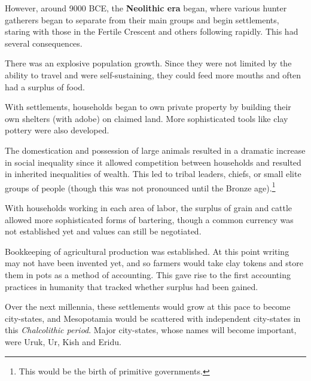 \documentclass{article}
\begin{document}
    However, around 9000 BCE, the \textbf{Neolithic era} began, where various hunter gatherers began to separate from their main groups and begin settlements, staring with those in the Fertile Crescent and others following rapidly. This had several consequences. 

    \begin{society}
      There was an explosive population growth. Since they were not limited by the ability to travel and were self-sustaining, they could feed more mouths and often had a surplus of food. 
    \end{society}

    \begin{finance}
      With settlements, households began to own private property by building their own shelters (with adobe) on claimed land. More sophisticated tools like clay pottery were also developed. 
    \end{finance}

    \begin{finance}
      The domestication and possession of large animals resulted in a dramatic increase in social inequality since it allowed competition between households and resulted in inherited inequalities of wealth. This led to tribal leaders, chiefs, or small elite groups of people (though this was not pronounced until the Bronze age).\footnote{This would be the birth of primitive governments.} 
    \end{finance}

    \begin{finance}
      With households working in each area of labor, the surplus of grain and cattle allowed more sophisticated forms of bartering, though a common currency was not established yet and values can still be negotiated. 
    \end{finance}

    \begin{finance}
      Bookkeeping of agricultural production was established. At this point writing may not have been invented yet, and so farmers would take clay tokens and store them in pots as a method of accounting. This gave rise to the first accounting practices in humanity that tracked whether surplus had been gained. 
    \end{finance}

    Over the next millennia, these settlements would grow at this pace to become city-states, and Mesopotamia would be scattered with independent city-states in this \textit{Chalcolithic period}. Major city-states, whose names will become important, were Uruk, Ur, Kish and Eridu. 
\end{document}
